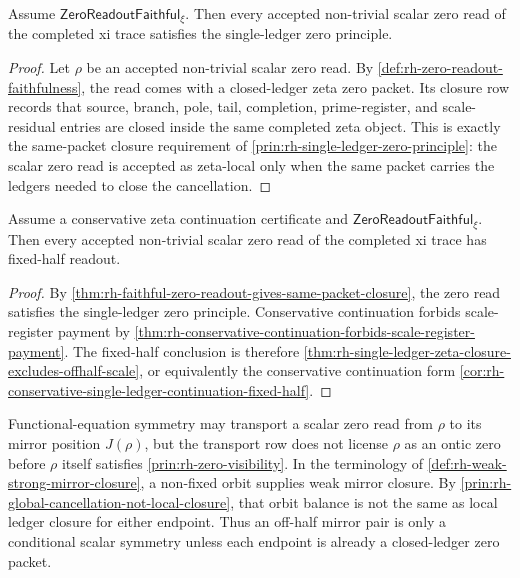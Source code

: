 \begin{theorem}
\label{thm:rh-faithful-zero-readout-gives-same-packet-closure}
Assume $\mathsf{ZeroReadoutFaithful}_{\xi}$.  Then every accepted
non-trivial scalar zero read of the completed xi trace satisfies the
single-ledger zero principle.
\end{theorem}

\begin{proof}
Let $\rho$ be an accepted non-trivial scalar zero read.  By
\autoref{def:rh-zero-readout-faithfulness}, the read comes with a
closed-ledger zeta zero packet.  Its closure row records that source,
branch, pole, tail, completion, prime-register, and scale-residual
entries are closed inside the same completed zeta object.  This is exactly
the same-packet closure requirement of
\autoref{prin:rh-single-ledger-zero-principle}: the scalar zero read is
accepted as zeta-local only when the same packet carries the ledgers
needed to close the cancellation.
\end{proof}

\begin{theorem}
\label{thm:rh-faithful-conservative-zero-readout-fixed-half}
Assume a conservative zeta continuation certificate and
$\mathsf{ZeroReadoutFaithful}_{\xi}$.  Then every accepted non-trivial
scalar zero read of the completed xi trace has fixed-half readout.
\end{theorem}

\begin{proof}
By
\autoref{thm:rh-faithful-zero-readout-gives-same-packet-closure}, the zero
read satisfies the single-ledger zero principle.  Conservative
continuation forbids scale-register payment by
\autoref{thm:rh-conservative-continuation-forbids-scale-register-payment}.
The fixed-half conclusion is therefore
\autoref{thm:rh-single-ledger-zeta-closure-excludes-offhalf-scale}, or
equivalently the conservative continuation form
\autoref{cor:rh-conservative-single-ledger-continuation-fixed-half}.
\end{proof}

\begin{principle}
\label{prin:rh-mirror-orbit-conditional-visibility}
Functional-equation symmetry may transport a scalar zero read from
$\rho$ to its mirror position $J(\rho)$, but the transport row does not
license $\rho$ as an ontic zero before $\rho$ itself satisfies
\autoref{prin:rh-zero-visibility}.  In the terminology of
\autoref{def:rh-weak-strong-mirror-closure}, a non-fixed orbit supplies
weak mirror closure.  By
\autoref{prin:rh-global-cancellation-not-local-closure}, that orbit
balance is not the same as local ledger closure for either endpoint.
Thus an off-half mirror pair is only a conditional scalar symmetry
unless each endpoint is already a closed-ledger zero packet.
\end{principle}

